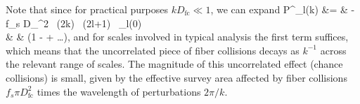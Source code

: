                                                                                                                                                                                                                                                                            Note that since for practical purposes $k D_\mathrm{fc} \ll 1$, we can expand 
                                                                                                                                                                                                                                                                           \beqa
                                                                                                                                                                                                                                                                           \Delta P^_l(k)  &= & -f_s \pi D_^2  \,  \Big({2\pi \over k}\Big) \ {(2l+1) }\, _l(0) \nonumber \\
                                                                                                                                                                                                                                                                           & & \times \Big(1 -  + \ldots \Big),
                                                                                                                                                                                                                                                                           \label{DeltaPuncorrexp}
                                                                                                                                                                                                                                                                           \eeqa
                                                                                                                                                                                                                                                                           and for scales involved in typical analysis the first term suffices, which means that the uncorrelated piece of fiber collisions decays as $k^{-1}$ across the relevant range of scales. The magnitude of this uncorrelated  effect (chance collisions) is small, given by the effective survey area affected by fiber collisions $f_s \pi D_\mathrm{fc}^2$ times the wavelength of perturbations $2\pi/k$.

